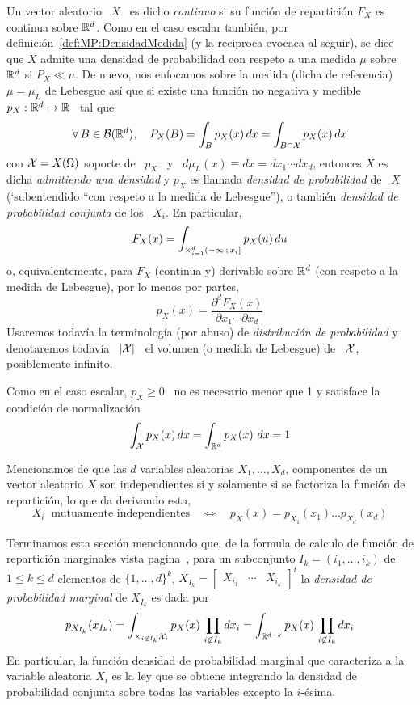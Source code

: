 \begin{definicion}
  Un  vector aleatorio  \  $X$ \  es dicho  {\it  continuo} si  su funci\'on  de
  repartici\'on  $F_X$ es  continua sobre  $\mathbb{R}^d$.  Como  en el  caso escalar
  tambi\'en,   por  definici\'on~\ref{def:MP:DensidadMedida}  (y   la  reciproca
  evocaca al  seguir), se dice que  $X$ admite una densidad  de probabilidad con
  respeto a  una medida $\mu$ sobre $\mathbb{R}^d$  si $P_X \ll \mu$.   De nuevo, nos
  enfocamos  sobre la medida  (dicha de  referencia) $\mu  = \mu_L$  de Lebesgue
  as\'i  que si  existe una  funci\'on  no negativa  y medible  \ $p_X:  \mathbb{R}^d
  \mapsto \mathbb{R}$ \ tal que
  \[
  \forall \,  B \in \mathcal{B}(\mathbb{R}^d),  \quad P_X(B) =  \int_B p_X(x) \, dx  = \int_{B
    \cap \mathcal{X}} p_X(x) \, dx
  \]
  con $\mathcal{X}  = X(\Omega)$ soporte  de \ $p_X$  \ y \  $d\mu_L(x) \equiv dx  = dx_1
  \cdots dx_d$, entonces  $X$ es dicha {\it admitiendo una  densidad} y $p_X$ es
  llamada {\it densidad de probabilidad} de \ $X$ (`subentendido ``con respeto a
  la medida de Lebesgue''), o  tambi\'en {\it densidad de probabilidad conjunta}
  de los \ $X_i$. En particular,
  \[
  F_X(x) =  \int_{\operatorname*{\times}_{i=1}^d (-\infty \, ;  \, x_i]} p_X(u) \, du
  \]
  o, equivalentemente,  para $F_X$ (continua  y) derivable sobre  $\mathbb{R}^d$ (con
  respeto a la medida de Lebesgue), por lo menos por partes,
  \[
  p_X(x) = \frac{\partial^d F_X(x)}{\partial x_1 \cdots \partial x_d}
  \]
  Usaremos  todav\'ia la terminolog\'ia  (por abuso)  de {\it  distribuci\'on de
    probabilidad} y  denotaremos todav\'ia  \ $|\mathcal{X}|$ \  el volumen (o  medida de
  Lebesgue) de \ $\mathcal{X}$, posiblemente infinito.
\end{definicion}

Como en el caso  escalar, $p_X \ge 0$ \ no es necesario  menor que 1 y satisface
la condici\'on de normalizaci\'on
%
\[
\int_{\mathcal{X}} p_X(x) \, dx = \int_{\mathbb{R}^d} p_X(x) \ dx  = 1
\]

Mencionamos de que las $d$  variables aleatorias $X_1, \ldots, X_d$, componentes
de un vector aleatorio $X$ son  independientes si y solamente si se factoriza la
funci\'on de repartici\'on, lo que da derivando esta,
%
\[
X_i \:  \mbox{ mutuamente independientes} \quad \Leftrightarrow  \quad p_X(x) =
p_{X_1}(x_1) \ldots p_{X_d}(x_d)
\]


Terminamos esta secci\'on mencionando que, de la formula de calculo de funci\'on
de  repartici\'on marginales vista  pagina~\pageref{pagina:MP:MarginalesF}, para
un subconjunto $I_k = (i_1,\ldots,i_k)$ de $1  \le k \le d$ elementos de $\{ 1 ,
\ldots   ,  d   \}^k$,   $X_{I_k}   =  \begin{bmatrix}   X_{i_1}   &  \cdots   &
  X_{i_k}\end{bmatrix}^t$  la   {\it  densidad  de   probabilidad  marginal}  de
$X_{I_k}$ es dada por
%
\[
p_{X_{I_k}}(x_{I_k})  = \int_{\times_{i  \not\in  I_k} \mathcal{X}_i}  p_X(x) \,  \prod_{i
    \not\in I_k}  dx_i =  \int_{\mathbb{R}^{d-k}} p_X(x) \,  \prod_{i \not\in
      I_k} dx_i
\]
%
En particular, la funci\'on densidad  de probabilidad marginal que caracteriza a
la variable aleatoria  $X_i$ es la ley que se obtiene  integrando la densidad de
probabilidad conjunta sobre todas las variables excepto la $i$-\'esima.

